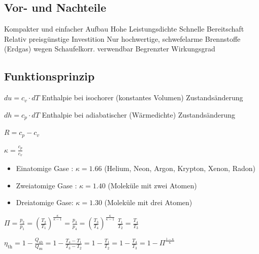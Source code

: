 \subsection{Vor- und Nachteile}
    \begin{itemize}
        \pro Kompakter und einfacher Aufbau
        \pro Hohe Leistungsdichte
        \pro Schnelle Bereitschaft
        \pro Relativ preisgünstige Investition
        \con Nur hochwertige, schwefelarme Brennstoffe (Erdgas) wegen Schaufelkorr. verwendbar
        \con Begrenzter Wirkungsgrad
    \end{itemize}

\subsection{Funktionsprinzip}
    \begin{minipage}[c]{0.9\columnwidth}
        $\boxed{du=c_v\cdot dT}$ Enthalpie bei isochorer (konstantes Volumen) Zustandsänderung

        $\boxed{dh=c_p\cdot dT}$ Enthalpie bei adiabatischer (Wärmedichte) Zustandsänderung

        \begin{minipage}[t]{0.2\columnwidth}
            $\boxed{R = c_p-c_v}$

            $\boxed{\kappa = \frac{c_p}{c_v}}$ 
        \end{minipage}%
        \hfill
        \begin{minipage}[t]{0.79\columnwidth}
            \begin{itemize}
                \item Einatomige Gase : $\kappa = 1.66$ (Helium, Neon, Argon, Krypton, Xenon, Radon)
                \item Zweiatomige Gase : $\kappa = 1.40$ (Moleküle mit zwei Atomen)
                \item Dreiatomige Gase: $\kappa = 1.30$ (Moleküle mit drei Atomen)
            \end{itemize}
        \end{minipage}

        $\boxed{\Pi = \frac{p_2}{p_1} = \left( \frac{T_2}{T_1}\right)^{\frac{\kappa}{\kappa-1}}=\frac{p_3}{p_4}=\left( \frac{T_3}{T_4}\right)^{\frac{\kappa}{\kappa-1}}}$
        $\boxed{\frac{T_1}{T_2}=\frac{T_4}{T_3}}$
        
        $\boxed{\eta_\mathrm{th} = 1- \frac{Q_{\mathrm{ab}}}{Q_{\mathrm{zu}}} = 1-\frac{T_4-T_1}{T_3-T_2}=1-\frac{T_1}{T_2}=1-\frac{T_4}{T_3}=1-\Pi^{\frac{1-\kappa}{\kappa}}}$


\end{minipage}

